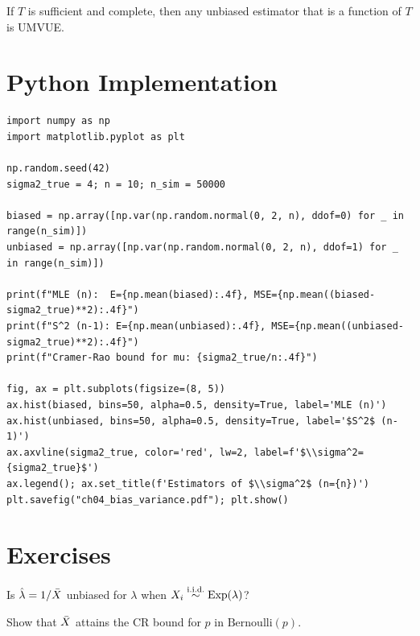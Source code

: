 \begin{theorem}
If $T$ is sufficient and complete, then any unbiased estimator that is a function of $T$ is UMVUE.
\end{theorem}

\section{Python Implementation}

\begin{python}
\begin{verbatim}
import numpy as np
import matplotlib.pyplot as plt

np.random.seed(42)
sigma2_true = 4; n = 10; n_sim = 50000

biased = np.array([np.var(np.random.normal(0, 2, n), ddof=0) for _ in range(n_sim)])
unbiased = np.array([np.var(np.random.normal(0, 2, n), ddof=1) for _ in range(n_sim)])

print(f"MLE (n):  E={np.mean(biased):.4f}, MSE={np.mean((biased-sigma2_true)**2):.4f}")
print(f"S^2 (n-1): E={np.mean(unbiased):.4f}, MSE={np.mean((unbiased-sigma2_true)**2):.4f}")
print(f"Cramer-Rao bound for mu: {sigma2_true/n:.4f}")

fig, ax = plt.subplots(figsize=(8, 5))
ax.hist(biased, bins=50, alpha=0.5, density=True, label='MLE (n)')
ax.hist(unbiased, bins=50, alpha=0.5, density=True, label='$S^2$ (n-1)')
ax.axvline(sigma2_true, color='red', lw=2, label=f'$\\sigma^2={sigma2_true}$')
ax.legend(); ax.set_title(f'Estimators of $\\sigma^2$ (n={n})')
plt.savefig("ch04_bias_variance.pdf"); plt.show()
\end{verbatim}
\end{python}

\section{Exercises}

\begin{exercise}[$\star$]
Is $\hat{\lambda}=1/\bar{X}$ unbiased for $\lambda$ when $X_i\overset{\text{i.i.d.}}{\sim}\mathrm{Exp}(\lambda)$?
\end{exercise}

\begin{exercise}
Show that $\bar{X}$ attains the CR bound for $p$ in $\mathrm{Bernoulli}(p)$.
\end{exercise}

